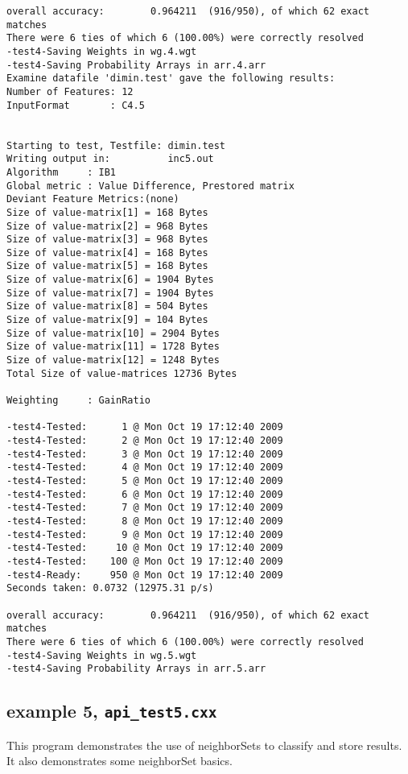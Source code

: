 \documentclass{report}
\begin{document}
\begin{footnotesize}
\begin{verbatim}
overall accuracy:        0.964211  (916/950), of which 62 exact matches 
There were 6 ties of which 6 (100.00%) were correctly resolved
-test4-Saving Weights in wg.4.wgt
-test4-Saving Probability Arrays in arr.4.arr
Examine datafile 'dimin.test' gave the following results:
Number of Features: 12
InputFormat       : C4.5


Starting to test, Testfile: dimin.test
Writing output in:          inc5.out
Algorithm     : IB1
Global metric : Value Difference, Prestored matrix
Deviant Feature Metrics:(none)
Size of value-matrix[1] = 168 Bytes 
Size of value-matrix[2] = 968 Bytes 
Size of value-matrix[3] = 968 Bytes 
Size of value-matrix[4] = 168 Bytes 
Size of value-matrix[5] = 168 Bytes 
Size of value-matrix[6] = 1904 Bytes 
Size of value-matrix[7] = 1904 Bytes 
Size of value-matrix[8] = 504 Bytes 
Size of value-matrix[9] = 104 Bytes 
Size of value-matrix[10] = 2904 Bytes 
Size of value-matrix[11] = 1728 Bytes 
Size of value-matrix[12] = 1248 Bytes 
Total Size of value-matrices 12736 Bytes 

Weighting     : GainRatio

-test4-Tested:      1 @ Mon Oct 19 17:12:40 2009
-test4-Tested:      2 @ Mon Oct 19 17:12:40 2009
-test4-Tested:      3 @ Mon Oct 19 17:12:40 2009
-test4-Tested:      4 @ Mon Oct 19 17:12:40 2009
-test4-Tested:      5 @ Mon Oct 19 17:12:40 2009
-test4-Tested:      6 @ Mon Oct 19 17:12:40 2009
-test4-Tested:      7 @ Mon Oct 19 17:12:40 2009
-test4-Tested:      8 @ Mon Oct 19 17:12:40 2009
-test4-Tested:      9 @ Mon Oct 19 17:12:40 2009
-test4-Tested:     10 @ Mon Oct 19 17:12:40 2009
-test4-Tested:    100 @ Mon Oct 19 17:12:40 2009
-test4-Ready:     950 @ Mon Oct 19 17:12:40 2009
Seconds taken: 0.0732 (12975.31 p/s)

overall accuracy:        0.964211  (916/950), of which 62 exact matches 
There were 6 ties of which 6 (100.00%) were correctly resolved
-test4-Saving Weights in wg.5.wgt
-test4-Saving Probability Arrays in arr.5.arr
\end{verbatim}
\end{footnotesize}
\clearpage

\subsection{example 5, {\tt api\_test5.cxx}}

This program demonstrates the use of neighborSets to classify and
store results. It also demonstrates some neighborSet basics.
\end{document}
